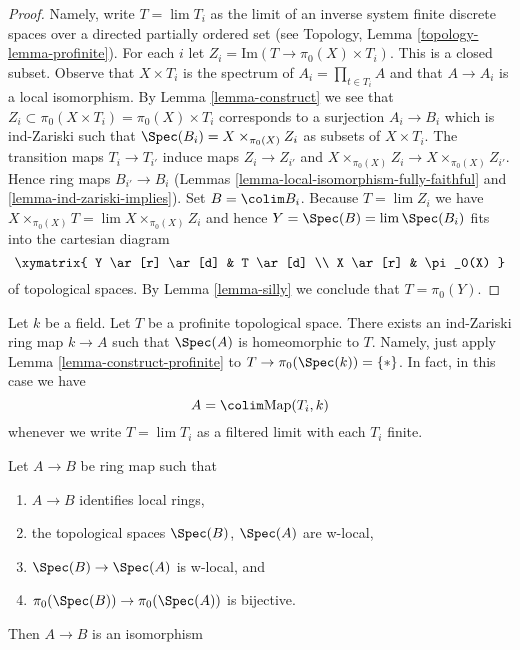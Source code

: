 \begin{proof}
Namely, write $T = \lim T_i$ as the limit of an inverse system finite
discrete spaces over a directed partially ordered set (see
Topology, Lemma \ref{topology-lemma-profinite}). For each $i$ let
$Z_i = \text{Im}(T \to \pi_0(X) \times T_i)$. This is a closed subset.
Observe that $X \times T_i$ is the spectrum of $A_i = \prod_{t \in T_i} A$
and that $A \to A_i$ is a local isomorphism. By Lemma \ref{lemma-construct}
we see that $Z_i \subset \pi_0(X \times T_i) = \pi_0(X) \times T_i$
corresponds to a surjection $A_i \to B_i$ which is ind-Zariski
such that $\Spec(B_i) = X \times_{\pi_0(X)} Z_i$ as subsets of
$X \times T_i$. The transition maps $T_i \to T_{i'}$ induce maps
$Z_i \to Z_{i'}$ and $X \times_{\pi_0(X)} Z_i \to X \times_{\pi_0(X)} Z_{i'}$.
Hence ring maps $B_{i'} \to B_i$
(Lemmas \ref{lemma-local-isomorphism-fully-faithful} and
\ref{lemma-ind-zariski-implies}).
Set $B = \colim B_i$. Because $T = \lim Z_i$ we have
$X \times_{\pi_0(X)} T = \lim  X \times_{\pi_0(X)} Z_i$
and hence $Y = \Spec(B) = \lim \Spec(B_i)$
fits into the cartesian diagram
$$
\xymatrix{
Y \ar[r] \ar[d] & T \ar[d] \\
X \ar[r] & \pi_0(X)
}
$$
of topological spaces. By Lemma \ref{lemma-silly}
we conclude that $T = \pi_0(Y)$.
\end{proof}

\begin{example}
\label{example-construct-space}
Let $k$ be a field. Let $T$ be a profinite topological space.
There exists an ind-Zariski ring map $k \to A$ such that
$\Spec(A)$ is homeomorphic to $T$. Namely, just apply
Lemma \ref{lemma-construct-profinite} to $T \to \pi_0(\Spec(k)) = \{*\}$.
In fact, in this case we have
$$
A = \colim \text{Map}(T_i, k)
$$
whenever we write $T = \lim T_i$ as a filtered limit with each $T_i$ finite.
\end{example}

\begin{lemma}
\label{lemma-w-local-morphism-equal-points-stalks-is-iso}
Let $A \to B$ be ring map such that
\begin{enumerate}
\item $A \to B$ identifies local rings,
\item the topological spaces $\Spec(B)$, $\Spec(A)$ are w-local,
\item $\Spec(B) \to \Spec(A)$ is w-local, and
\item $\pi_0(\Spec(B)) \to \pi_0(\Spec(A))$ is bijective.
\end{enumerate}
Then $A \to B$ is an isomorphism
\end{lemma}

